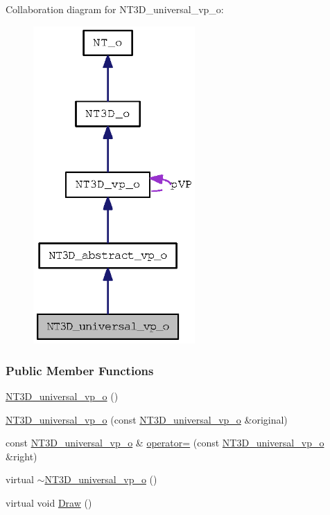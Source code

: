 Collaboration diagram for NT3D\_\-universal\_\-vp\_\-o:
\nopagebreak
\begin{figure}[H]
\begin{center}
\leavevmode
\includegraphics[width=175pt]{class_n_t3_d__universal__vp__o__coll__graph}
\end{center}
\end{figure}
\subsubsection*{Public Member Functions}
\begin{DoxyCompactItemize}
\item 
\hyperlink{class_n_t3_d__universal__vp__o_a86d1c157e62fa8dce2caa1b1f1d7cad3}{NT3D\_\-universal\_\-vp\_\-o} ()
\item 
\hyperlink{class_n_t3_d__universal__vp__o_adb419a7b5d28829fade60296a324e3c9}{NT3D\_\-universal\_\-vp\_\-o} (const \hyperlink{class_n_t3_d__universal__vp__o}{NT3D\_\-universal\_\-vp\_\-o} \&original)
\item 
const \hyperlink{class_n_t3_d__universal__vp__o}{NT3D\_\-universal\_\-vp\_\-o} \& \hyperlink{class_n_t3_d__universal__vp__o_a6e157df640410d6d8fa6fdadaa26396c}{operator=} (const \hyperlink{class_n_t3_d__universal__vp__o}{NT3D\_\-universal\_\-vp\_\-o} \&right)
\item 
virtual \hyperlink{class_n_t3_d__universal__vp__o_a429ffdaf6f69fc2478be3f41b184decf}{$\sim$NT3D\_\-universal\_\-vp\_\-o} ()
\item 
virtual void \hyperlink{class_n_t3_d__universal__vp__o_ac3671542d72aa3ce3d38593e0c1f7e21}{Draw} ()
\end{DoxyCompactItemize}


